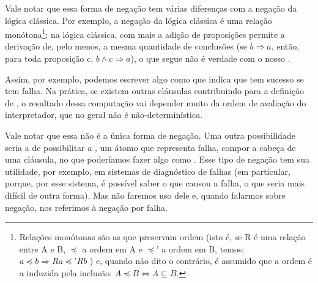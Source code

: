 Vale notar que essa forma de negação tem várias diferenças com a
negação da lógica clássica. Por exemplo, a negação da lógica clássica
é uma relação monótona\footnote{Relações monótonas são as que
  preservam ordem (isto é, se R é uma relação entre A e B, $\preceq$ a
  ordem em A e $\preceq$' a ordem em B, temos: $a \preceq b
  \Rightarrow Ra \preceq' Rb$ ) e, quando não dito o contrário, é
  assumido que a ordem é a induzida pela inclusão: $A \preceq B
  \Leftrightarrow A \subseteq B$.}: na lógica clássica, com mais a
adição de proposições permite a derivação de, pelo menos, a mesma
quantidade de conclusões (se $b \Rightarrow a$, então, para toda
proposição c, $b \wedge c \Rightarrow a$), o que segue não é verdade
com o nosso .

Assim, por exemplo, podemos escrever algo como 
que indica que  tem sucesso se  tem falha. Na
prática, se existem outras cláusulas contribuindo para a definição de
, o resultado dessa computação vai depender muito da ordem
de avaliação do interpretador, que no geral não é não-determinística.

Vale notar que essa não é a única forma de negação. Uma outra
possibilidade seria a de possibilitar a , um átomo que
representa falha, compor a cabeça de uma cláusula, no que poderíamos
fazer algo como .  Esse tipo de
negação tem sua utilidade, por exemplo, em sistemas de diagnóstico de
falhas (em particular, porque, por esse sistema, é possível saber o
que causou a falha, o que seria mais difícil de outra forma). Mas não
faremos uso dele e, quando falarmos sobre negação, nos referimos à
negação por falha.

%
